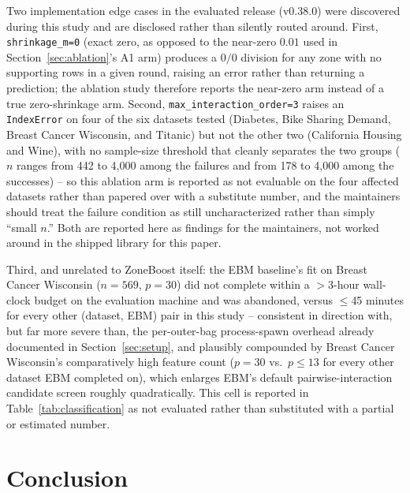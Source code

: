 \documentclass[11pt]{article}
\begin{document}
Two implementation edge cases in the evaluated release (v0.38.0) were
discovered during this study and are disclosed rather than silently
routed around. First, \texttt{shrinkage\_m=0} (exact zero, as opposed to
the near-zero $0.01$ used in Section~\ref{sec:ablation}'s A1 arm) produces
a $0/0$ division for any zone with no supporting rows in a given round,
raising an error rather than returning a prediction; the ablation study
therefore reports the near-zero arm instead of a true zero-shrinkage arm.
Second, \texttt{max\_interaction\_order=3} raises an \texttt{IndexError}
on four of the six datasets tested (Diabetes, Bike Sharing Demand, Breast
Cancer Wisconsin, and Titanic) but not the other two (California Housing
and Wine), with no sample-size threshold that cleanly separates the two
groups ($n$ ranges from 442 to 4{,}000 among the failures and from 178 to
4{,}000 among the successes) -- so this ablation arm is reported as not
evaluable on the four affected datasets rather than papered over with a
substitute number, and the maintainers should treat the failure condition
as still uncharacterized rather than simply ``small $n$.''
Both are reported here as findings for the maintainers, not worked around
in the shipped library for this paper.

Third, and unrelated to ZoneBoost itself: the EBM baseline's fit on Breast
Cancer Wisconsin ($n=569$, $p=30$) did not complete within a $>$3-hour
wall-clock budget on the evaluation machine and was abandoned, versus
$\leq$45 minutes for every other (dataset, EBM) pair in this study --
consistent in direction with, but far more severe than, the per-outer-bag
process-spawn overhead already documented in Section~\ref{sec:setup}, and
plausibly compounded by Breast Cancer Wisconsin's comparatively high
feature count ($p=30$ vs.\ $p\leq13$ for every other dataset EBM completed
on), which enlarges EBM's default pairwise-interaction candidate screen
roughly quadratically. This cell is reported in
Table~\ref{tab:classification} as not evaluated rather than substituted
with a partial or estimated number.

\section{Conclusion}
\label{sec:conclusion}
\end{document}
